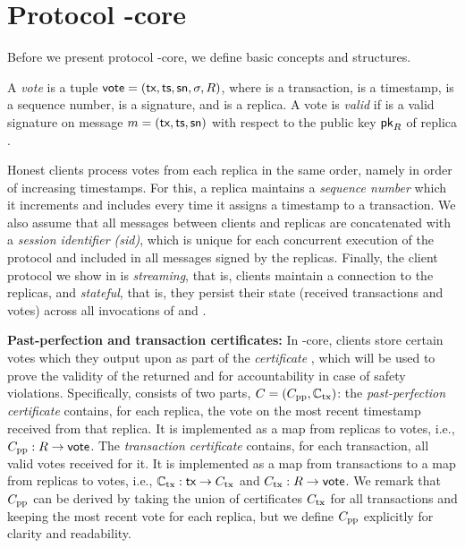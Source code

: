 \section{Protocol \podtm-core}\label{sec:pod-core-const}

Before we present protocol \podtm-core, we define basic concepts and structures.

\begin{definition}[Vote]
    A \emph{vote} is a tuple $\textsf{vote} = (\textsf{tx}, \textsf{ts}, \textsf{sn}, \sigma, R)$, where \tx is a transaction, \tsp is a timestamp, \sn is a sequence number, \sig is a signature, and  \rep is a replica.
    A vote is \emph{valid} if \sig is a valid signature on message $m = (\textsf{tx}, \textsf{ts}, \textsf{sn})$ with respect to the public key $\textsf{pk}_R$ of replica \rep.
\end{definition}

\begin{remark}
    Honest clients process votes from each replica in the same order, namely in order of increasing timestamps. For this, a replica maintains a \emph{sequence number} which it increments and includes every time it assigns a timestamp to a transaction.
    We also assume that all messages between clients and replicas are concatenated with a \emph{session identifier (sid)}, which is unique for each concurrent execution of the protocol and included in all messages signed by the replicas.
    Finally, the client protocol we show in  is \emph{streaming}, that is, clients maintain a connection to the replicas, and \emph{stateful}, that is, they persist their state (received transactions and votes) across all invocations of \opwrite{} and \opreadall{}.
\end{remark}


\textbf{Past-perfection and transaction certificates:}
In \podtm-core, clients store certain votes which they output upon \opreadall{} as part of the \emph{certificate} \cert, which will be used to prove the validity of the returned \Pod and for accountability in case of safety violations.
Specifically, \cert consists of two parts, $C = (C_\text{pp}, \mathbb{C}_\text{tx})$: the \emph{past-perfection certificate} \ppcert contains, for each replica, the vote on the most recent timestamp received from that replica. It is implemented as a map from replicas to votes, i.e., $C_\text{pp}: R \rightarrow \textsf{vote}$.
The \emph{transaction certificate} \alltxcert contains, for each transaction, all valid votes received for it.
It is implemented as a map from transactions to a map from replicas to votes, i.e., $\mathbb{C}_\text{tx}: \textsf{tx} \rightarrow C_\text{tx}$ and $C_\text{tx}: R \rightarrow \textsf{vote}$.
We remark that $C_\text{pp}$ can be derived by taking the union of certificates $C_\text{tx}$ for all transactions and keeping the most recent vote for each replica, but we define $C_\text{pp}$ explicitly for clarity and readability.

